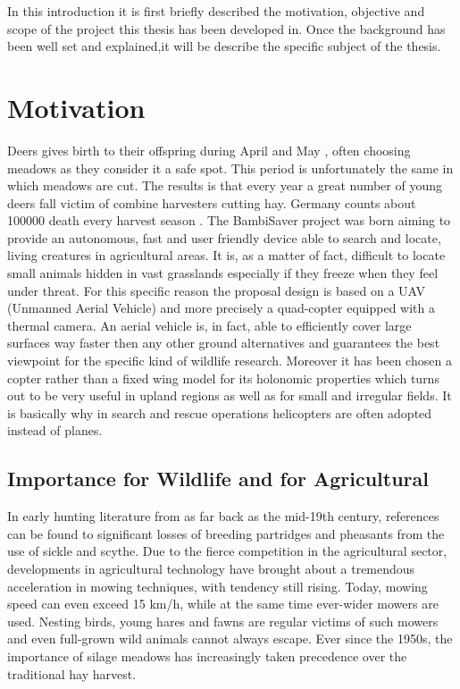 


In this introduction it is first briefly described the motivation, objective and scope of the project this thesis has been developed in. Once the background has been well set and explained,it will be describe the specific subject of the thesis.


\section{Motivation} %
\label{sec:motivation}
 Deers gives birth to their offspring during April and May \cite{MowlingMortality}, often choosing meadows as they consider it a safe spot. This period is unfortunately the same in which meadows are cut. The results is that every year a great number of young deers fall victim of combine harvesters cutting hay. Germany counts about 100000 death every harvest season \cite{MowlingMortality}.
 The BambiSaver project was born aiming to provide an autonomous, fast and user friendly device able to search and locate, living creatures in agricultural areas. It is, as a matter of fact, difficult to locate small animals hidden in vast grasslands especially if they freeze when they feel under threat. For this specific reason the proposal design is based on a UAV (Unmanned Aerial Vehicle) \cite{ICAO} and more precisely a quad-copter equipped with a thermal camera.
 An aerial vehicle is, in fact, able to efficiently cover large surfaces way faster then any other ground alternatives and guarantees the best viewpoint for the specific kind of wildlife research. Moreover it has been chosen a copter rather than a fixed wing model for its holonomic properties which turns out to be very useful in upland regions as well as for small and irregular fields. It is basically why in search and rescue operations helicopters are often adopted instead of planes.

\subsection{Importance for Wildlife and for Agricultural}
In early hunting literature from as far back as the mid-19th century, references can be found to significant losses of breeding partridges and pheasants from the use of sickle and scythe. Due to the fierce competition in the agricultural sector, developments in agricultural technology have brought about a tremendous acceleration in mowing techniques, with tendency still rising. Today, mowing speed can even exceed 15 km/h, while at the same time ever-wider mowers are used. Nesting birds, young hares and fawns are regular victims of such mowers and even full-grown wild animals cannot always escape. Ever since the 1950s, the importance of silage meadows has increasingly taken precedence over the traditional hay harvest.

